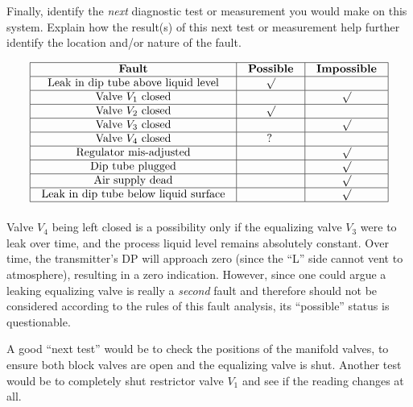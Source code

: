 Finally, identify the {\it next} diagnostic test or measurement you would make on this system.  Explain how the result(s) of this next test or measurement help further identify the location and/or nature of the fault.















$$\vbox{\offinterlineskip
\halign{\strut
\vrule \quad\hfil # \ \hfil & 
\vrule \quad\hfil # \ \hfil & 
\vrule \quad\hfil # \ \hfil \vrule \cr
\noalign{\hrule}
%
{\bf Fault} & {\bf Possible} & {\bf Impossible} \cr
%
\noalign{\hrule}
%
Leak in dip tube above liquid level & $\surd$ &  \cr
%
\noalign{\hrule}
%
Valve $V_1$ closed &  & $\surd$ \cr
%
\noalign{\hrule}
%
Valve $V_2$ closed & $\surd$ &  \cr
%
\noalign{\hrule}
%
Valve $V_3$ closed &  & $\surd$ \cr
%
\noalign{\hrule}
%
Valve $V_4$ closed & ? & \cr
%
\noalign{\hrule}
%
Regulator mis-adjusted &  & $\surd$ \cr
%
\noalign{\hrule}
%
Dip tube plugged &  & $\surd$ \cr
%
\noalign{\hrule}
%
Air supply dead &  & $\surd$ \cr
%
\noalign{\hrule}
%
Leak in dip tube below liquid surface &  & $\surd$ \cr
%
\noalign{\hrule}
} %
}$$ %

Valve $V_4$ being left closed is a possibility only if the equalizing valve $V_3$ were to leak over time, and the process liquid level remains absolutely constant.  Over time, the transmitter's DP will approach zero (since the ``L'' side cannot vent to atmosphere), resulting in a zero indication.  However, since one could argue a leaking equalizing valve is really a {\it second} fault and therefore should not be considered according to the rules of this fault analysis, its ``possible'' status is questionable.

\vskip 10pt

A good ``next test'' would be to check the positions of the manifold valves, to ensure both block valves are open and the equalizing valve is shut.  Another test would be to completely shut restrictor valve $V_1$ and see if the reading changes at all.






